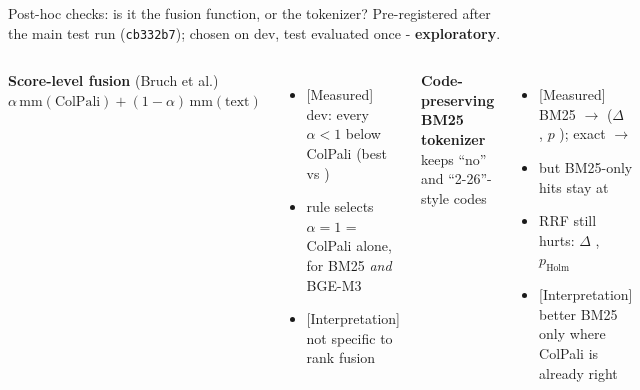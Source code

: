 \documentclass[aspectratio=169,11pt]{beamer}
\newcommand{\lbl}[2]{\textsf{\scriptsize\textcolor{#1}{[#2]}}}
\newcommand{\Mea}{\lbl{bgAqua}{Measured}}
\newcommand{\Int}{\lbl{tagI}{Interpretation}}
\begin{document}
\begin{frame}{Post-hoc checks: is it the fusion function, or the tokenizer?}
\small Pre-registered after the main test run (\texttt{cb332b7}); chosen on dev, test evaluated once - \textbf{exploratory}.\\[6pt]
\begin{columns}[T]
\textbf{Score-level fusion} (Bruch et al.)\\[2pt]
$\alpha\,\mathrm{mm}(\text{ColPali}) + (1-\alpha)\,\mathrm{mm}(\text{text})$
\begin{itemize}
  \item \Mea{} dev: every $\alpha<1$ below ColPali (best \devBestBelowOneCcc{} vs \devB{})
  \item rule selects $\alpha = 1$ = ColPali alone, for BM25 \emph{and} BGE-M3
  \item \Int{} not specific to rank fusion
\end{itemize}
\textbf{Code-preserving BM25 tokenizer}\\[2pt]
keeps ``no'' and ``2-26''-style codes
\begin{itemize}
  \item \Mea{} BM25 \testA{} $\rightarrow$ \testAcode{} ($\Delta$ \deltaAcodeA{}, $p$ \pAcodeA{}); exact \typeexactA{} $\rightarrow$ \typeexactAcode{}
  \item but BM25-only hits stay at \headAcodeOnly{}
  \item RRF still hurts: $\Delta$ \deltaCcode{}, $p_\text{Holm}$ \pHolmCcode{}
  \item \Int{} better BM25 only where ColPali is already right
\end{itemize}
\end{columns}
\end{frame}
\end{document}
